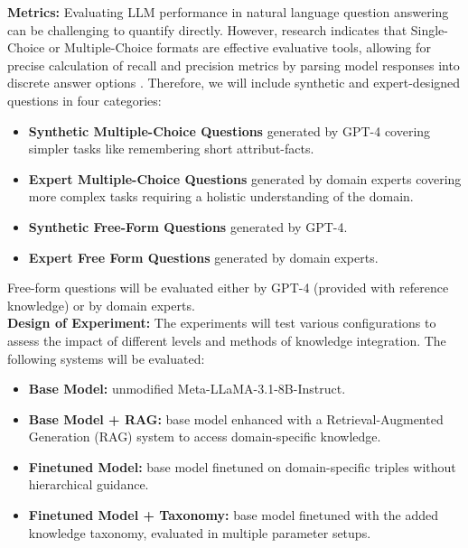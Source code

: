 \documentclass[11pt,a4paper, titlepage=false]{scrreprt}
\begin{document}
\textbf{Metrics:} Evaluating LLM performance in natural language question answering can be challenging to quantify directly. However, research indicates that Single-Choice or Multiple-Choice formats are effective evaluative tools, allowing for precise calculation of recall and precision metrics by parsing model responses into discrete answer options \cite{zhang2024multiplechoicequestionsefficientrobust}. Therefore, we will include synthetic and expert-designed questions in four categories:

\begin{itemize}
  \item \textbf{Synthetic Multiple-Choice Questions} generated by GPT-4 \cite{openai2023gpt4} covering simpler tasks like remembering short attribut-facts.
  \item \textbf{Expert Multiple-Choice Questions} generated by domain experts covering more complex tasks requiring a holistic understanding of the domain.
  \item \textbf{Synthetic Free-Form Questions} generated by GPT-4.
  \item \textbf{Expert Free Form Questions} generated by domain experts.
\end{itemize}

Free-form questions will be evaluated either by GPT-4 (provided with reference knowledge) or by domain experts.\\


\textbf{Design of Experiment:} The experiments will test various configurations to assess the impact of different levels and methods of knowledge integration. The following systems will be evaluated:

\begin{itemize}
  \item \textbf{Base Model:} unmodified Meta-LLaMA-3.1-8B-Instruct.
  \item \textbf{Base Model + RAG:} base model enhanced with a Retrieval-Augmented Generation (RAG) system to access domain-specific knowledge.
  \item \textbf{Finetuned Model:} base model finetuned on domain-specific triples without hierarchical guidance.
  \item \textbf{Finetuned Model + Taxonomy:} base model finetuned with the added knowledge taxonomy, evaluated in multiple parameter setups.
\end{itemize}


\end{document}
